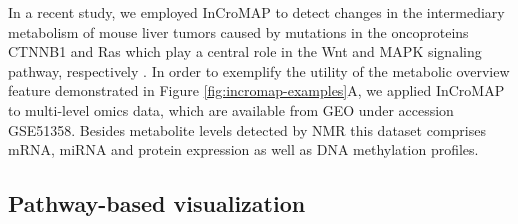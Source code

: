 \documentclass[final,5p,times,twocolumn]{elsarticle}
\newcommand\red[1]{{\color{red}#1}}
\begin{document}
In a recent study, we employed InCroMAP to detect changes in the intermediary metabolism of mouse liver tumors caused by mutations in the oncoproteins CTNNB1 and Ras which play a central role in the Wnt and MAPK signaling pathway, respectively \cite{Unterberger2014}. \red{In order to exemplify the utility of the metabolic overview feature demonstrated in Figure \ref{fig:incromap-examples}A, we applied InCroMAP to multi-level omics data, which are available from GEO under accession GSE51358. Besides metabolite levels detected by NMR this dataset comprises mRNA, miRNA and protein expression as well as DNA methylation profiles.}

\subsection{Pathway-based visualization}
\end{document}
